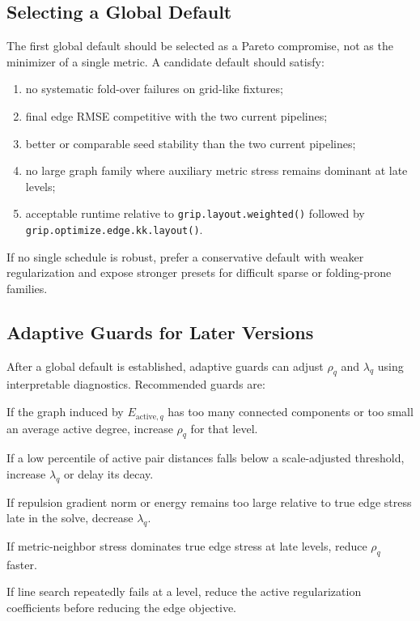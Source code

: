\documentclass[11pt]{article}
\newcommand{\Rfunc}[1]{\texttt{#1}}
\begin{document}
\subsection{Selecting a Global Default}

The first global default should be selected as a Pareto compromise, not as the
minimizer of a single metric. A candidate default should satisfy:
\begin{enumerate}[leftmargin=2em]
  \item no systematic fold-over failures on grid-like fixtures;
  \item final edge RMSE competitive with the two current pipelines;
  \item better or comparable seed stability than the two current pipelines;
  \item no large graph family where auxiliary metric stress remains dominant at
  late levels;
  \item acceptable runtime relative to
  \Rfunc{grip.layout.weighted()} followed by
  \Rfunc{grip.optimize.edge.kk.layout()}.
\end{enumerate}

If no single schedule is robust, prefer a conservative default with weaker
regularization and expose stronger presets for difficult sparse or folding-prone
families.

\subsection{Adaptive Guards for Later Versions}

After a global default is established, adaptive guards can adjust \(\rho_q\) and
\(\lambda_q\) using interpretable diagnostics. Recommended guards are:
\begin{description}[leftmargin=2em]
  \item[Active-edge sparsity guard] If the graph induced by
  \(E_{\mathrm{active},q}\) has too many connected components or too small an
  average active degree, increase \(\rho_q\) for that level.
  \item[Collapse guard] If a low percentile of active pair distances falls below
  a scale-adjusted threshold, increase \(\lambda_q\) or delay its decay.
  \item[Repulsion-dominance guard] If repulsion gradient norm or energy remains
  too large relative to true edge stress late in the solve, decrease
  \(\lambda_q\).
  \item[Auxiliary-metric-dominance guard] If metric-neighbor stress dominates
  true edge stress at late levels, reduce \(\rho_q\) faster.
  \item[Armijo-failure guard] If line search repeatedly fails at a level, reduce
  the active regularization coefficients before reducing the edge objective.
\end{description}
\end{document}
